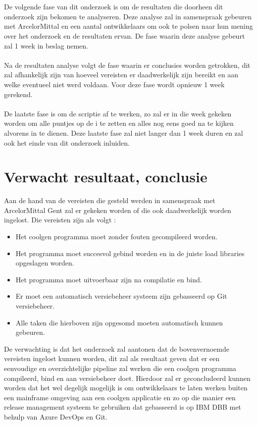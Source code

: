 \\ \\
De volgende fase van dit onderzoek is om de resultaten die doorheen dit onderzoek zijn bekomen te analyseren. 
Deze analyse zal in samenspraak gebeuren met ArcelorMittal en een aantal ontwikkelaars om ook te polsen naar hun mening over het onderzoek en de resultaten ervan. 
De fase waarin deze analyse gebeurt zal 1 week in beslag nemen.
\\ \\
Na de resultaten analyse volgt de fase waarin er conclusies worden getrokken, dit zal afhankelijk zijn van hoeveel vereisten er daadwerkelijk zijn bereikt en aan welke eventueel niet werd voldaan. 
Voor deze fase wordt opnieuw 1 week gerekend.
\\ \\
De laatste fase is om de scriptie af te werken, zo zal er in die week gekeken worden om alle puntjes op de i te zetten en alles nog eens goed na te kijken alvorens in te dienen.
Deze laatste fase zal niet langer dan 1 week duren en zal ook het einde van dit onderzoek inluiden.  



\section{Verwacht resultaat, conclusie}%
\label{sec:verwachte_resultaten}

Aan de hand van de vereisten die gesteld werden in samenspraak met ArcelorMittal Gent zal er gekeken worden of die ook daadwerkelijk worden ingelost. 
Die vereisten zijn als volgt :
\begin{itemize}
  \item Het coolgen programma moet zonder fouten gecompileerd worden.
  \item Het programma moet succesvol gebind worden en in de juiste load libraries opgeslagen worden. 
  \item Het programma moet uitvoerbaar zijn na compilatie en bind.
  \item Er moet een automatisch versiebeheer systeem zijn gebasseerd op Git versiebeheer.
  \item Alle taken die hierboven zijn opgesomd moeten automatisch kunnen gebeuren.
\end{itemize}

De verwachting is dat het onderzoek zal aantonen dat de bovenvernoemde vereisten ingelost kunnen worden, dit zal als resultaat geven dat er een eenvoudige en overzichtelijke pipeline zal 
werken die een coolgen programma compileerd, bind en aan versiebeheer doet. 
Hierdoor zal er geconcludeerd kunnen worden dat het wel degelijk mogelijk is om ontwikkelaars te laten werken buiten een mainframe omgeving aan een coolgen applicatie en zo op die manier een 
release management systeem te gebruiken dat gebasseerd is op IBM DBB met behulp van Azure DevOps en Git.